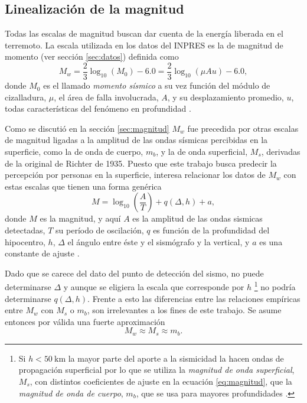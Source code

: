 \documentclass[a4paper]{report}
\begin{document}
\subsection{Linealización de la magnitud}
Todas las escalas de magnitud buscan dar cuenta de la energía liberada en el terremoto.
La escala utilizada en los datos del INPRES es la de magnitud de momento (ver sección \ref{sec:datos}) definida como \cite[ec. 4.23]{fowler_solid_1990}
\begin{equation}
	M_w =
	\frac{2}{3} \log_{10} \left( M_0 \right) - 6.0 = 
	\frac{2}{3} \log_{10} \left( \mu A u \right) - 6.0,
	\label{eq:momento}
\end{equation}
donde \(M_0\) es el llamado \emph{momento sísmico} a su vez función del módulo de cizalladura, \(\mu\), el área de falla involucrada, \(A\), y su desplazamiento promedio, \(u\), todas características del fenómeno en profundidad \cite*[sección 4.2.4]{fowler_solid_1990}.

Como se discutió en la sección \ref{sec:magnitud} \(M_w\) fue precedida por otras escalas de magnitud ligadas a la amplitud de las ondas sísmicas percibidas en la superficie, como la de onda de cuerpo, \(m_b\), y la de onda superficial, \(M_s\), derivadas de la original de Richter de 1935.
Puesto que este trabajo busca predecir la percepción por personas en la superficie, interesa relacionar los datos de \(M_w\) con estas escalas que tienen una forma genérica
\begin{equation}
	M = \log_{10} \left( \frac{A}{T} \right) + q(\Delta, h) + a,
	\label{eq:magnitud}
\end{equation}
donde \(M\) es la magnitud, y aquí \(A\) es la amplitud de las ondas sismicas detectadas, \(T\) su período de oscilación, \(q\) es función de la profundidad del hipocentro, \(h\), \(\Delta\) el ángulo entre éste y el sismógrafo y la vertical, y \(a\) es una constante de ajuste \cite[ecuación 4.13]{fowler_solid_1990}.

Dado que se carece del dato del punto de detección del sismo, no puede determinarse \(\Delta\) y aunque se eligiera la escala que corresponde por \(h\) \footnote{Si \(h< \SI{50}{\kilo\metre}\) la mayor parte del aporte a la sismicidad la hacen ondas de propagación superficial por lo que se utiliza la \emph{magnitud de onda superficial}, \(M_s\), con distintos coeficientes de ajuste en la ecuación \ref{eq:magnitud}, que la \emph{magnitud de onda de cuerpo}, \(m_b\), que se usa para mayores profundidades \cite[sección 4.2.3]{fowler_solid_1990}.} no podría determinarse \(q(\Delta, h)\).
Frente a esto las diferencias entre las relaciones empíricas entre \(M_w\) con \(M_s\) o \(m_b\)\cite{hanks_moment_1979}, son irrelevantes a los fines de este trabajo.
Se asume entonces por válida una fuerte aproximación
\begin{equation}
	M_w \approx M_s \approx m_b.
	\label{eq:igualdad}
\end{equation}
\end{document}
